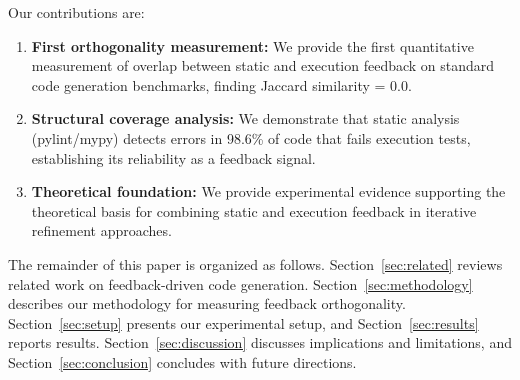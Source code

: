 Our contributions are:

\begin{enumerate}
    \item \textbf{First orthogonality measurement:} We provide the first quantitative measurement of overlap between static and execution feedback on standard code generation benchmarks, finding Jaccard similarity = 0.0.

    \item \textbf{Structural coverage analysis:} We demonstrate that static analysis (pylint/mypy) detects errors in 98.6\% of code that fails execution tests, establishing its reliability as a feedback signal.

    \item \textbf{Theoretical foundation:} We provide experimental evidence supporting the theoretical basis for combining static and execution feedback in iterative refinement approaches.
\end{enumerate}

The remainder of this paper is organized as follows. Section~\ref{sec:related} reviews related work on feedback-driven code generation. Section~\ref{sec:methodology} describes our methodology for measuring feedback orthogonality. Section~\ref{sec:setup} presents our experimental setup, and Section~\ref{sec:results} reports results. Section~\ref{sec:discussion} discusses implications and limitations, and Section~\ref{sec:conclusion} concludes with future directions.
